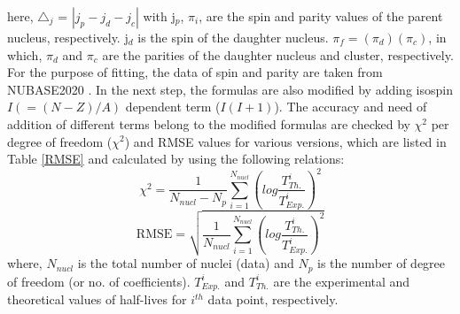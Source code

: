 \documentclass[preprint,10pt]{elsarticle}
\begin{document}
here, $\triangle_j$ = $|j_p - j_d - j_c|$ with j$_{p}$, $\pi_{i}$, are the spin and parity values of the parent nucleus, respectively. j$_{d}$ is the spin of the daughter nucleus. $\pi_{f} = (\pi_{d})(\pi_{c})$, in which, $\pi_{d}$ and $\pi_{c}$ are the parities of the daughter nucleus and cluster, respectively. For the purpose of fitting, the data of spin and parity are taken from NUBASE2020 \cite{audi20201}. In the next step, the formulas are also modified by adding isospin $I (=(N-Z)/A)$ dependent term ($I(I+1)$). The accuracy and need of addition of different terms belong to the modified formulas are checked by ${\chi}^2$ per degree of freedom (${\chi}^2$) and RMSE values for various versions, which are listed in Table \ref{RMSE} and calculated by using the following relations:
      \begin{equation}
\chi^2 = \frac{1}{N_{nucl}-N_{p}}\sum^{N_{nucl}}_{i=1}\left(log\frac{T^i_{Th.}}{T^i_{Exp.}}\right)^2
\label{kai}
\end{equation}
   \begin{equation}
\text{RMSE}  = \sqrt{\frac{1}{N_{nucl}}\sum^{N_{nucl}}_{i=1}\left(log\frac{T^i_{Th.}}{T^i_{Exp.}}\right)^2}
\label{rmse}
\end{equation}
where, $N_{nucl}$ is the total number of nuclei (data) and $N_{p}$ is the number of degree of freedom (or no. of coefficients). $T^i_{Exp.}$ and
$T^i_{Th.}$ are the experimental and theoretical values of half-lives for $i^{th}$ data point, respectively.
\end{document}
